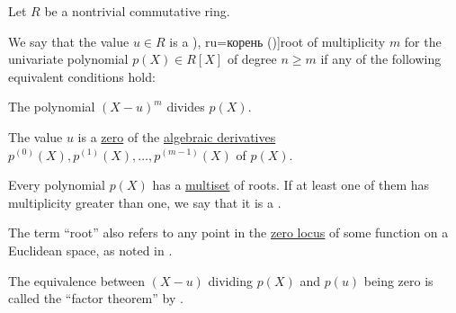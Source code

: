 \begin{definition}\label{def:polynomial_root}\mimprovised
  Let \( R \) be a nontrivial commutative ring.

  We say that the value \( u \in R \) is a \term[bg=корен (\cite[33]{ГеновМиховскиМоллов1991Алгебра}), ru=корень (\cite[99]{Винберг2014Алгебра})]{root} of multiplicity \( m \) for the univariate polynomial \( p(X) \in R[X] \) of degree \( n \geq m \) if any of the following equivalent conditions hold:
  \begin{thmenum}
     The polynomial \( (X - u)^m \) divides \( p(X) \).

     The value \( u \) is a \hyperref[def:zero_locus]{zero} of the \hyperref[def:algebraic_derivative]{algebraic derivatives} \( p^{(0)}(X), p^{(1)}(X), \ldots, p^{(m-1)}(X) \) of \( p(X) \).
  \end{thmenum}

  Every polynomial \( p(X) \) has a \hyperref[def:multiset]{multiset} of roots. If at least one of them has multiplicity greater than one, we say that it is a .
\end{definition}
\begin{comments}
  \item The term \enquote{root} also refers to any point in the \hyperref[def:zero_locus]{zero locus} of some function on a Euclidean space, as noted in .

  \item The equivalence between \( (X - u) \) dividing \( p(X) \) and \( p(u) \) being zero is called the \enquote{factor theorem} by .
\end{comments}
